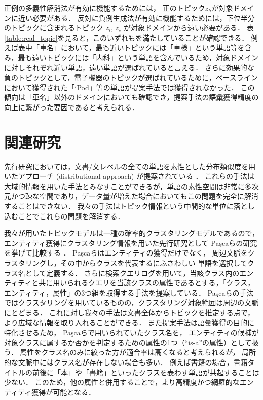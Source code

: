 \documentclass[japanese]{jnlp_1.4}
\begin{document}
正例の多義性解消法が有効に機能するためには，
正のトピック$z_h$が対象ドメインに近い必要がある．
反対に負例生成法が有効に機能するためには，下位半分のトピックに含まれるトピック $z_l$, $z_e$ が対象ドメインから遠い必要がある．
表\ref{table:real_topic}を見ると，このいずれもを満たしていることが確認できる．
例えば表中「車名」において，最も近いトピックには「車検」という単語等を含み，最も遠いトピックには「内科」という単語を含んでいるため，対象ドメインに対しそれぞれ近い単語，遠い単語が選ばれていると言える．
さらに効果的な負のトピックとして，電子機器のトピックが選ばれているために，ベースラインにおいて獲得された「iPod」等の単語が提案手法では獲得されなかった．
この傾向は「車名」以外のドメインにおいても確認でき，提案手法の語彙獲得精度の向上に繋がった要因であると考えられる．


\section{関連研究}

先行研究においては，文書/文レベルの全ての単語を素性とした分布類似度を用いたアプローチ (distributional approach) が提案されている \cite{pantel2009web}．
これらの手法は大域的情報を用いた手法とみなすことができるが，単語の素性空間は非常に多次元かつ疎な空間であり，データ量が増えた場合においてもこの問題を完全に解消することはできない．
我々の手法はトピック情報という中間的な単位に落とし込むことでこれらの問題を解消する．


我々が用いたトピックモデルは一種の確率的クラスタリングモデルであるので，
エンティティ獲得にクラスタリング情報を用いた先行研究として
Pa\c{s}caらの研究を挙げて比較する \cite{pasca2008weakly}．
Pa\c{s}caらはエンティティの獲得だけでなく，
周辺文脈をクラスタリングし，その中からクラスを代表するにふさわしい
単語を選択してクラス名として定義する．
さらに検索クエリログを用いて，当該クラス内のエンティティと共に用いられるクエリを当該クラスの属性であるとする，「クラス，エンティティ，属性」の3つ組を取得する手法を提案している．
Pa\c{s}caらの手法ではクラスタリングを用いているものの，クラスタリング対象範囲は周辺の文脈にとどまる．
これに対し我々の手法は文書全体からトピックを推定する点で，より広域な情報を取り入れることができる．
また提案手法は語彙獲得の目的に特化させるため，
Pa\c{s}caらで用いられていたクラス名を，
エンティティの候補が対象クラスに属するか否かを判定するための属性の1つ（``is-a''の属性）として扱う．
属性をクラス名のみに絞った方が適合率は高くなると考えられるが，
局所的な文脈中にはクラス名が存在しない場合も多い．
例えば書籍の場合，書籍タイトルの前後に「本」や「書籍」といったクラスを表わす単語が共起することは少ない．
このため，他の属性と併用することで，より高精度かつ網羅的なエンティティ獲得が可能となる．
\end{document}

